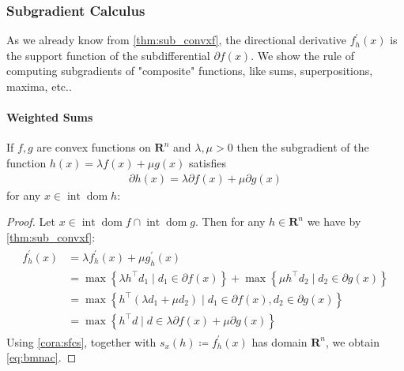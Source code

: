 \documentclass{article}
\newcommand{\inte}{\operatorname{int}}
\newcommand{\dom}{\operatorname{dom}}
\begin{document}
\subsubsection{Subgradient Calculus}\label{sec:sub_cal}
As we already know from \cref{thm:sub_convxf}, the directional derivative $f_{h}^{\prime}(x)$ is the support function of the subdifferential $\partial f(x)$.  We show the rule of computing subgradients of "composite" functions, like sums, superpositions, maxima, etc..

\paragraph{Weighted Sums}
If $f, g$ are convex functions on $\mathbf{R}^{n}$ and $\lambda, \mu>0$ then the subgradient of the function $h(x)=\lambda f(x)+\mu g(x)$ satisfies
\begin{align}
\partial h(x)=\lambda \partial f(x)+\mu \partial g(x)\label{eq:bmnac}
\end{align}
for any $x \in\inte \dom h$:
\begin{proof}\color{ForestGreen}
Let $x \in\inte \dom f \cap\inte \dom g$. Then for any $h \in \mathbf{R}^{n}$ we have by \cref{thm:sub_convxf}:
\begin{align*}
\begin{aligned}
f_{h}^{\prime}(x) &=\lambda f_{h}^{\prime}(x)+\mu g_{h}^{\prime}(x) \\
&=\max \left\{\lambda h^{\top} d_{1} \mid d_{1} \in \partial f(x)\right\}+\max \left\{\mu h^{\top} d_{2} \mid d_{2} \in \partial g(x)\right\} \\
&=\max \left\{h^{\top}\left(\lambda d_{1}+\mu d_{2}\right) \mid d_{1} \in \partial f(x), d_{2} \in \partial g(x)\right\} \\
&=\max \left\{h^{\top} d \mid d \in \lambda \partial f(x)+\mu \partial g(x)\right\}
\end{aligned}
\end{align*}
Using \cref{cora:sfcs}, together with $s_x(h)\coloneqq f_{h}^{\prime}(x)$ has domain $\mathbf{R}^n$, we obtain \cref{eq:bmnac}.
\end{proof}
\end{document}
